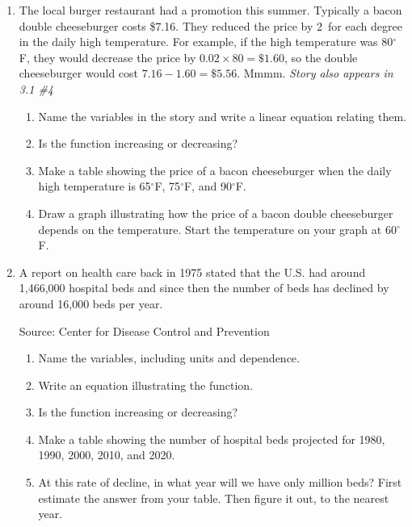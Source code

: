\begin{enumerate}
\item The local burger restaurant had a promotion this summer.  Typically a bacon double cheeseburger costs \$7.16.  They reduced the price by 2\textcent~for each degree in the daily high temperature. For example, if the high temperature was 80$^\circ$F, they would decrease the price by $0.02 \times 80 = \$1.60$, so the double cheeseburger would cost $7.16-1.60=\$5.56$.  Mmmm.
\hfill \emph{Story also appears in 3.1 \#4} 
\begin{enumerate}
\item Name the variables in the story and write a linear equation relating them.
\item Is the function increasing or decreasing?
\item Make a table showing the price of a bacon cheeseburger when the daily high temperature is 65$^\circ$F, 75$^\circ$F, and 90$^\circ$F.
\item Draw a graph illustrating how the price of a bacon double cheeseburger depends on the temperature.  Start the temperature on your graph at 60$^\circ$F.
\end{enumerate} 

\item A report on health care back in 1975 stated that the U.S. had around 1,466,000 hospital beds and since then the number of beds has declined by around 16,000 beds  per year.   
\hfill \begin{footnotesize} Source:  Center for Disease Control and Prevention \end{footnotesize}
\begin{enumerate}
\item Name the variables, including units and dependence.
\item Write an equation illustrating the function.
\item Is the function increasing or decreasing?
\item Make a table showing the number of hospital beds projected for 1980, 1990, 2000, 2010, and 2020.  
\item  At this rate of decline, in what year will we have only  million beds?  First estimate the answer from your table.  Then figure it out, to the nearest year.
\end{enumerate}


\end{enumerate}
